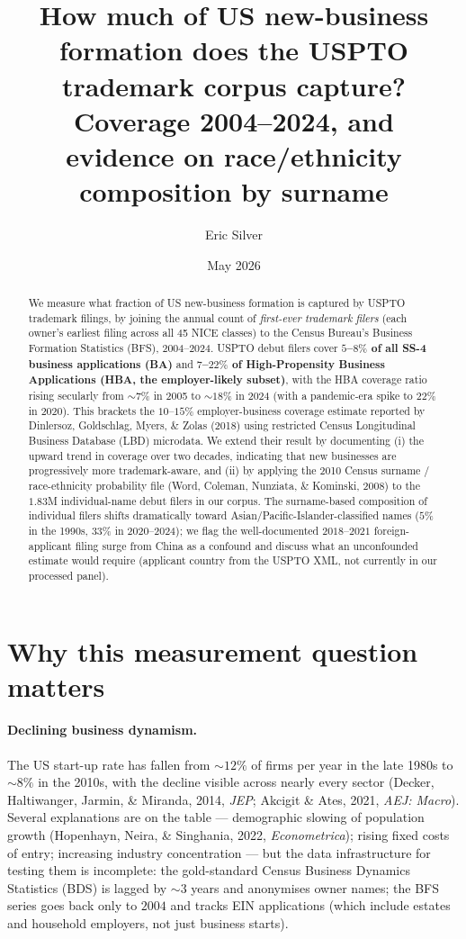 \documentclass[11pt]{article}
\title{How much of US new-business formation does the USPTO\\trademark corpus capture? Coverage 2004--2024, and\\evidence on race/ethnicity composition by surname}
\author{Eric Silver}
\affil{}
\date{May 2026}
\begin{document}
\maketitle

\begin{abstract}
We measure what fraction of US new-business formation is captured by
USPTO trademark filings, by joining the annual count of \emph{first-ever
trademark filers} (each owner's earliest filing across all 45 NICE
classes) to the Census Bureau's Business Formation Statistics (BFS),
2004--2024. USPTO debut filers cover \textbf{$5$--$8\%$ of all SS-4
business applications (BA)} and \textbf{$7$--$22\%$ of High-Propensity
Business Applications (HBA, the employer-likely subset)}, with the
HBA coverage ratio rising secularly from $\sim 7\%$ in 2005 to
$\sim 18\%$ in 2024 (with a pandemic-era spike to $22\%$ in 2020). This
brackets the $10$--$15\%$ employer-business coverage estimate reported
by Dinlersoz, Goldschlag, Myers, \& Zolas (2018) using restricted
Census Longitudinal Business Database (LBD) microdata. We extend
their result by documenting (i) the upward trend in coverage over
two decades, indicating that new businesses are progressively more
trademark-aware, and (ii) by applying the 2010 Census surname /
race-ethnicity probability file (Word, Coleman, Nunziata, \& Kominski,
2008) to the $1.83$M individual-name debut filers in our corpus. The
surname-based composition of individual filers shifts dramatically
toward Asian/Pacific-Islander-classified names ($5\%$ in the 1990s,
$33\%$ in 2020--2024); we flag the well-documented $2018$--$2021$
foreign-applicant filing surge from China as a confound and discuss
what an unconfounded estimate would require (applicant country from
the USPTO XML, not currently in our processed panel).
\end{abstract}

\section{Why this measurement question matters}

\paragraph{Declining business dynamism.} The US start-up rate has
fallen from $\sim 12\%$ of firms per year in the late 1980s to
$\sim 8\%$ in the 2010s, with the decline visible across nearly every
sector (Decker, Haltiwanger, Jarmin, \& Miranda, 2014, \emph{JEP};
Akcigit \& Ates, 2021, \emph{AEJ: Macro}). Several explanations are on
the table --- demographic slowing of population growth (Hopenhayn,
Neira, \& Singhania, 2022, \emph{Econometrica}); rising fixed costs of
entry; increasing industry concentration --- but the data
infrastructure for testing them is incomplete: the gold-standard
Census Business Dynamics Statistics (BDS) is lagged by $\sim 3$ years
and anonymises owner names; the BFS series goes back only to $2004$
and tracks EIN applications (which include estates and household
employers, not just business starts).
\end{document}
